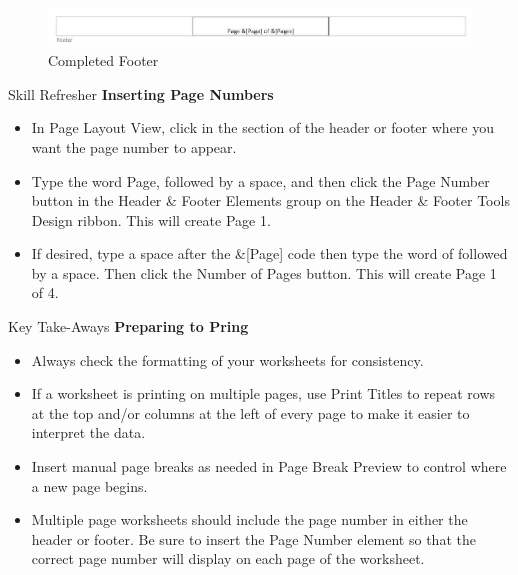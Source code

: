 \begin{figure}[H]
	\centering
	\includegraphics[width=\maxwidth{.95\linewidth}]{gfx/ch03_fig33}
	\caption{Completed Footer}
	\label{03:fig33}
\end{figure}

\begin{center}
	\begin{sklbox}{Skill Refresher}
		\textbf{Inserting Page Numbers}
		\\
		\begin{itemize}
			\setlength{\itemsep}{0pt}
			\setlength{\parskip}{0pt}
			\setlength{\parsep}{0pt}

			\item In Page Layout View, click in the section of the header or footer where you want the page number to appear.
			\item Type the word Page, followed by a space, and then click the Page Number button in the Header \& Footer Elements group on the Header \& Footer Tools Design ribbon. This will create Page 1.
			\item If desired, type a space after the \&[Page] code then type the word of followed by a space. Then click the Number of Pages button. This will create Page 1 of 4.
			
		\end{itemize}
	\end{sklbox}
\end{center}


\begin{center}
	\begin{tkwbox}{Key Take-Aways}
		\textbf{Preparing to Pring}
		\\
		\begin{itemize}
			\setlength{\itemsep}{0pt}
			\setlength{\parskip}{0pt}
			\setlength{\parsep}{0pt}

			\item Always check the formatting of your worksheets for consistency.
			\item If a worksheet is printing on multiple pages, use Print Titles to repeat rows at the top and/or columns at the left of every page to make it easier to interpret the data.
			\item Insert manual page breaks as needed in Page Break Preview to control where a new page begins.
			\item Multiple page worksheets should include the page number in either the header or footer. Be sure to insert the Page Number element so that the correct page number will display on each page of the worksheet.
			
		\end{itemize}
	\end{tkwbox}
\end{center}

